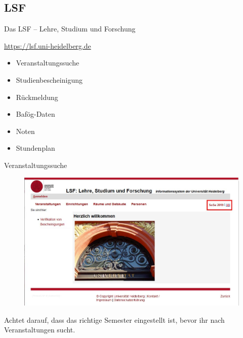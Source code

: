 \subsection{LSF}
\begin{frame}{Das LSF -- Lehre, Studium und Forschung}

    \large \url{https://lsf.uni-heidelberg.de} \\
    \begin{minipage}[t]{0.515\textwidth}
        \begin{itemize}
            \item{Veranstaltungssuche}
            \item{Studienbescheinigung}
            \item{Rückmeldung}
            \item{Bafög-Daten}
            \item{Noten}
            \item{Stundenplan}
        \end{itemize}
    \end{minipage}
    \begin{minipage}[t]{0.475\textwidth}
        \vspace{0.1cm}
        \begin{center}
        \end{center}
    \end{minipage}
\end{frame}

\begin{frame}{Veranstaltungssuche}
    \begin{figure}
        \centering
        \includegraphics[scale=0.3]{images/lsf01.jpg}
    \end{figure}
Achtet darauf, dass das richtige Semester eingestellt ist, bevor ihr nach Veranstaltungen sucht.
\end{frame}

